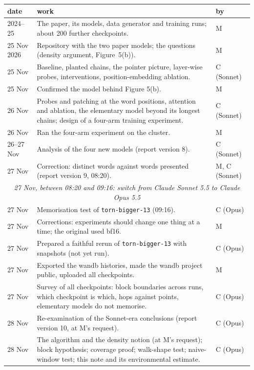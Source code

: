 \documentclass[11pt,a4paper]{article}
\newcommand{\tb}{\texttt{torn-bigger-13}}
\begin{document}
\begin{center}
\small
\begin{tabular}{p{2.2cm}p{10.0cm}l}
\toprule
date & work & by\\
\midrule
2024--25 & The paper, its models, data generator and training runs; about 200 further checkpoints. & M\\
25 Nov 2026 & Repository with the two paper models; the questions (density argument, Figure~5(b)). & M\\
25 Nov & Baseline, planted chains, the pointer picture, layer-wise probes, interventions, position-embedding ablation. & C (Sonnet)\\
25 Nov & Confirmed the model behind Figure 5(b). & M\\
26 Nov & Probes and patching at the word positions, attention and ablation, the elementary model beyond its longest chains; design of a four-arm training experiment. & C (Sonnet)\\
26 Nov & Ran the four-arm experiment on the cluster. & M\\
26--27 Nov & Analysis of the four new models (report version 8). & C (Sonnet)\\
27 Nov & Correction: distinct words against words presented (report version 9, 08:20). & M, C (Sonnet)\\
\midrule
\multicolumn{3}{c}{\textit{27 Nov, between 08:20 and 09:16: switch from Claude Sonnet 5.5 to Claude Opus 5.5}}\\
\midrule
27 Nov & Memorisation test of \tb{} (09:16). & C (Opus)\\
27 Nov & Corrections: experiments should change one thing at a time; the original used bf16. & M\\
27 Nov & Prepared a faithful rerun of \tb{} with snapshots (not yet run). & C (Opus)\\
27 Nov & Exported the wandb histories, made the wandb project public, uploaded all checkpoints. & M\\
27 Nov & Survey of all checkpoints: block boundaries across runs, which checkpoint is which, hops against points, elementary models do not memorise. & C (Opus)\\
28 Nov & Re-examination of the Sonnet-era conclusions (report version 10, at M's request). & C (Opus)\\
28 Nov & The algorithm and the density notion (at M's request); block hypothesis; coverage proof; walk-shape test; naive-window test; this note and its environmental estimate. & C (Opus)\\
\bottomrule
\end{tabular}
\end{center}
\end{document}
